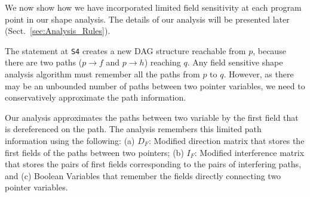 \documentclass[runningheads,a4paper]{llncs}
\newcommand{\p}{\ensuremath{p}}
\newcommand{\q}{\ensuremath{q}}
\begin{document}
We now show how we have incorporated limited field
sensitivity at each program point  in our shape
analysis. The details of our analysis will be presented later
(Sect.~\ref{sec:Analysis_Rules}).

\begin{example}{\rm 
The statement at {\tt S4} creates a new DAG structure
reachable from $\p$, because there are two paths ($\p
  \rightarrow f$ and $\p \rightarrow h$) reaching $\q$. Any
field sensitive shape analysis algorithm must remember all
the paths from $\p$ to $\q$. However, as there may be an
unbounded number of paths between two pointer variables, we
need to conservatively approximate the path information.

Our analysis approximates the paths between two variable by
the first field that is dereferenced on the path. The
analysis remembers this limited path information using the
following: (a) $D_F$:  Modified direction matrix that  stores
the first fields of the paths between two pointers; (b)
$I_F$: Modified interference matrix that stores the pairs of first fields
corresponding to the pairs of interfering paths, and (c)
Boolean Variables that remember the fields directly
connecting two pointer variables. 



}
\end{example}
\end{document}
